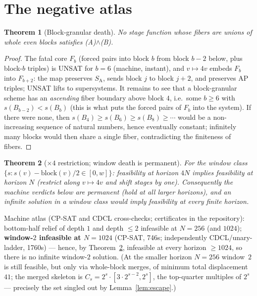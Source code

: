 \documentclass[11pt]{article}
\newtheorem{theorem}{Theorem}
\theoremstyle{definition}
\newcommand{\SA}{S_{\mathrm{A}}}
\begin{document}
\section{The negative atlas}\label{sec:negative}

\begin{theorem}[Block-granular death]\label{thm:blockgranular}
No stage function whose fibers are unions of whole even blocks satisfies
(A)$\wedge$(B).
\end{theorem}

\begin{proof}
The fatal core $F_b$ (forced pairs into block
$b$ from block $b{-}2$ below, plus block-$b$ triples) is UNSAT for $b=6$
(machine, instant), and $v \mapsto 4v$ embeds $F_b$ into $F_{b+2}$: the map
preserves $\SA$, sends block $j$ to block $j{+}2$, and preserves AP triples;
UNSAT lifts to supersystems. It remains to see that a block-granular scheme
has an \emph{ascending} fiber boundary above block $4$, i.e.\ some
$b \ge 6$ with $s(B_{b-2}) < s(B_b)$ (this is what puts the forced pairs of
$F_b$ into the system). If there were none, then
$s(B_4) \ge s(B_6) \ge s(B_8) \ge \cdots$ would be a non-increasing
sequence of natural numbers, hence eventually constant; infinitely many
blocks would then share a single fiber, contradicting the finiteness of
fibers.
\end{proof}

\begin{theorem}[$\times 4$ restriction; window death is permanent]
\label{thm:restriction}
For the window class $\{s : s(v)-\mathrm{block}(v)/2 \in [0,w]\}$:
feasibility at horizon $4N$ implies feasibility at horizon $N$ (restrict
along $v \mapsto 4v$ and shift stages by one). Consequently the machine
verdicts below are permanent (hold at all larger horizons), and an infinite
solution in a window class would imply feasibility at every finite horizon.
\end{theorem}

\noindent Machine atlas (CP-SAT and CDCL cross-checks; certificates in the
repository): bottom-half relief of depth $1$ and depth $\le 2$ infeasible at
$N=256$ (and $1024$); \textbf{window-$2$ infeasible at $N=1024$} (CP-SAT, 746s; independently CDCL/unary-ladder, 1760s) --- hence, by
Theorem~\ref{thm:restriction}, infeasible at every horizon
$\ge 1024$, so there is no infinite window-$2$ solution. (At the smaller
horizon $N=256$ window~$2$ is still feasible, but only via whole-block
merges, of minimum total displacement $41$; the merged skeleton is
$C_s = 2^{s}\cdot[3\cdot 2^{s-2}, 2^{s}]$, the top-quarter multiples of
$2^{s}$ --- precisely the set singled out by Lemma~\ref{lem:escape}.)
\end{document}
